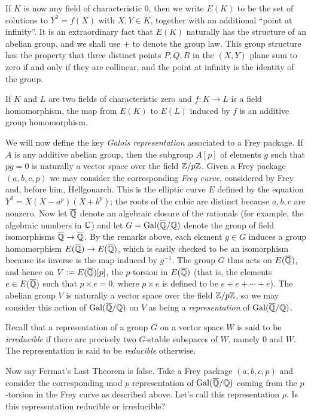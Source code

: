 If $K$ is now any field of characteristic 0, then we write $E(K)$ to be the set of solutions to $Y^2=f(X)$ with $X,Y\in K$, together with an additional ``point at infinity''. It is an extraordinary fact that $E(K)$ naturally has the structure of an abelian group, and we shall use $+$ to denote the group law. This group structure has the property that three distinct points $P,Q,R$ in the $(X,Y)$ plane sum to zero if and only if they are collinear, and the point at infinity is the identity of the group.

If $K$ and $L$ are two fields of characteristic zero and $f:K\to L$ is a field homomorphism, the map from $E(K)$ to $E(L)$ induced by $f$ is an additive group homomorphism. 

We will now define the key \emph{Galois representation} associated to a Frey package. If $A$ is any additive abelian group, then the subgroup $A[p]$ of elements $g$ such that $pg=0$ is naturally a vector space over the field $\mathbb{Z}/p\mathbb{Z}$. Given a Frey package $(a,b,c,p)$ we may consider the corresponding \emph{Frey curve}, considered by Frey and, before him, Hellgouarch. This is the elliptic curve $E$ defined by the equation $Y^2=X(X-a^p)(X+b^p)$; the roots of the cubic are distinct because $a,b,c$ are nonzero. Now let $\overline{\mathbb{Q}}$ denote an algebraic closure of the rationals (for example, the algebraic numbers in $\mathbb{C}$) and let $G=\operatorname{Gal}(\overline{\mathbb{Q}}/\mathbb{Q})$ denote the group of field isomorphisms $\overline{\mathbb{Q}}\to\overline{\mathbb{Q}}$. By the remarks above, each element $g\in G$ induces a group homomorphism $E(\overline{\mathbb{Q}})\to E(\overline{\mathbb{Q}})$, which is easily checked to be an isomorphism because its inverse is the map induced by $g^{-1}$. The group $G$ thus acts on $E(\overline{\mathbb{Q}})$, and hence on $V:=E(\overline{\mathbb{Q}})[p]$, the $p$-torsion in $E(\overline{\mathbb{Q}})$ (that is, the elements $e\in E(\overline{\mathbb{Q}})$ such that $p\times e=0$, where $p\times e$ is defined to be $e+e+\cdots+e$). The abelian group $V$ is naturally a vector space over the field $\mathbb{Z}/p\mathbb{Z}$, so we may consider this action of $\operatorname{Gal}(\overline{\mathbb{Q}}/\mathbb{Q})$ on $V$ as being a \emph{representation} of $\operatorname{Gal}(\overline{\mathbb{Q}}/\mathbb{Q})$.

Recall that a representation of a group $G$ on a vector space $W$ is said to be \emph{irreducible} if there are precisely two $G$-stable subspaces of $W$, namely $0$ and $W$. The representation is said to be \emph{reducible} otherwise.

Now say Fermat's Last Theorem is false. Take a Frey package $(a,b,c,p)$ and consider the corresponding mod $p$ representation of $\operatorname{Gal}(\overline{\mathbb{Q}}/\mathbb{Q})$ coming from the $p$-torsion in the Frey curve as described above. Let's call this representation $\rho$. Is this representation reducible or irreducible?


